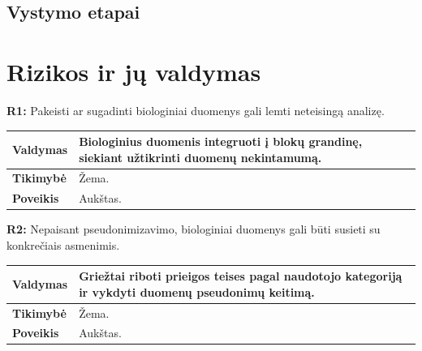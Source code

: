 \documentclass[12pt]{article}
\begin{document}
\subsection{Vystymo etapai}

\newpage

\section{Rizikos ir jų valdymas}
\noindent \textbf{R1:} Pakeisti ar sugadinti biologiniai duomenys gali lemti
neteisingą analizę.

\label{sec:R1}
\begin{table}[htb!]
    \captionsetup{justification=centering}
    \vskip -10pt
    \begin{tabular}{|m{3cm}|m{13.7cm}|}
        \hline
        \raggedleft \textbf{\cellcolor{deepchampagne}Valdymas} &
        Biologinius duomenis integruoti į blokų grandinę, siekiant užtikrinti
        duomenų nekintamumą. \\
        \hline
        \raggedleft \textbf{\cellcolor{deepchampagne}Tikimybė} & Žema. \\
        \hline
        \raggedleft \textbf{\cellcolor{deepchampagne}Poveikis} & Aukštas. \\
        \hline
    \end{tabular}
\end{table}

\noindent \textbf{R2:} Nepaisant pseudonimizavimo, biologiniai duomenys gali
būti susieti su konkrečiais asmenimis.

\label{sec:R2}
\begin{table}[htb!]
    \captionsetup{justification=centering}
    \vskip -10pt
    \begin{tabular}{|m{3cm}|m{13.7cm}|}
        \hline
        \raggedleft \textbf{\cellcolor{deepchampagne}Valdymas} &
        Griežtai riboti prieigos teises pagal naudotojo kategoriją ir vykdyti
        duomenų pseudonimų keitimą. \\
        \hline
        \raggedleft \textbf{\cellcolor{deepchampagne}Tikimybė} & Žema. \\
        \hline
        \raggedleft \textbf{\cellcolor{deepchampagne}Poveikis} & Aukštas. \\
        \hline
    \end{tabular}
\end{table}
\end{document}
